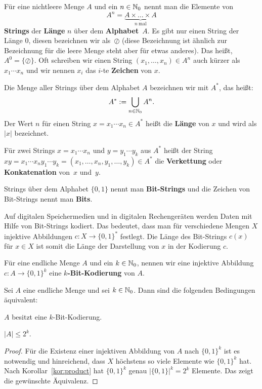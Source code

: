 \begin{defn} 
	Für eine nichtleere Menge $A$ und ein $n \in \mathbb{N}_0$ nennt man die Elemente von 
	\[
		A^n = \underbrace{A\times\ldots\times A}_{n \ \text{mal}}
	\]
	\textbf{Strings} der \textbf{Länge} $n$ über dem \textbf{Alphabet}~$A$.
	Es gibt nur einen String der Länge $0$, diesen bezeichnen wir als~$\oslash$ (diese Bezeichnung ist ähnlich zur Bezeichnung für die leere Menge steht aber für etwas anderes). 
	Das heißt, $A^0 = \{\oslash\}$. 
	Oft schreiben wir einen String $(x_1,\ldots,x_n) \in A^n$ auch kürzer als $x_1 \cdots x_n$ und wir nennen $x_i$ das $i$-te \textbf{Zeichen} von $x$. 
	
	Die Menge aller Strings über dem Alphabet $A$ bezeichnen wir mit $A^\ast$, das heißt: 
	\[
		A^\ast := \bigcup_{n \in \mathbb{N}_0} A^n.
	\]
	Der Wert $n$ für einen String $x = x_1 \cdots x_n \in A^\ast$ heißt die \textbf{Länge} von $x$ und wird als $|x|$ bezeichnet. 
\end{defn}

\begin{defn} 
		Für zwei Strings $x=x_1 \cdots x_n$ und $y=y_1 \cdots y_k$ aus $A^\ast$ heißt der String $xy = x_1 \cdots x_n y_1 \cdots y_k = (x_1,\ldots,x_n,y_1,\ldots,y_k) \in A^\ast$ die \textbf{Verkettung} oder \textbf{Konkatenation} von~$x$ und~$y$. 
\end{defn} 

\begin{defn} 
		Strings über dem Alphabet $\{0,1\}$ nennt man \textbf{Bit-Strings} und die Zeichen von Bit-Strings nennt man \textbf{Bits}.
\end{defn} 

\begin{bem}
	Auf digitalen Speichermedien und in digitalen Rechengeräten werden Daten mit Hilfe von Bit-Strings kodiert. Das bedeutet, dass man für verschiedene Mengen $X$ injektive Abbildungen $c : X \to \{0,1\}^\ast$ festlegt. Die Länge des Bit-Strings $c(x)$ für $x \in X$ ist somit die Länge der Darstellung von $x$ in der Kodierung $c$. 
\end{bem} 

\begin{defn}
	Für eine endliche Menge $A$ und ein $k \in \mathbb{N}_0$, nennen wir eine injektive Abbildung $c: A \to \{0,1\}^k$ eine \textbf{$k$-Bit-Kodierung} von $A$. 
\end{defn} 

\begin{prop}
Sei $A$ eine endliche Menge und sei $k \in \mathbb{N}_0$. Dann sind die folgenden Bedingungen äquivalent: 
\begin{enumi} 
	\item $A$ besitzt eine $k$-Bit-Kodierung.
	\item $ |A| \le 2^k$. 
\end{enumi} 
\end{prop} 
\begin{proof} 
	Für die Existenz einer injektiven Abbildung von $A$ nach $\{0,1\}^k$ ist es notwendig und hinreichend, dass $X$ höchstens so viele Elemente wie $\{0,1\}^k$ hat. Nach Korollar~\ref{kor:product}  hat $\{0,1\}^k$ genau $|\{0,1\}|^k = 2^k$ Elemente. Das zeigt die gewünschte Äquivalenz. 
\end{proof} 

